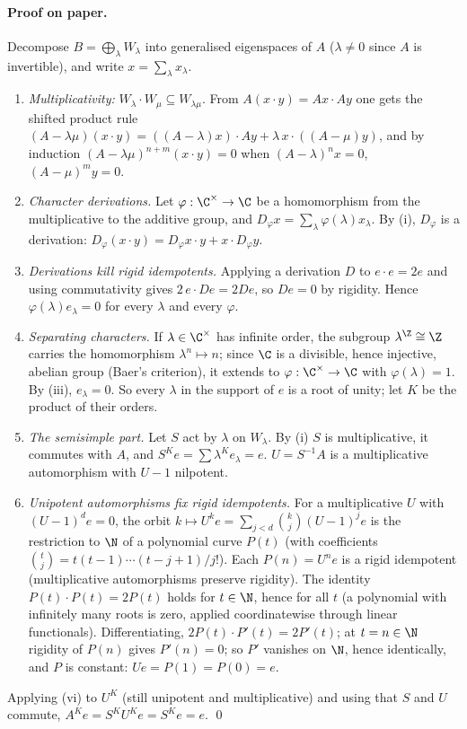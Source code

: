\paragraph{Proof on paper.}  Decompose $B=\bigoplus_\lambda W_\lambda$ into generalised eigenspaces of $A$ ($\lambda\neq0$
since $A$ is invertible), and write $x=\sum_\lambda x_\lambda$.
\begin{enumerate}[label=(\roman*)]
\item \emph{Multiplicativity:} $W_\lambda\cdot W_\mu\subseteq W_{\lambda\mu}$.  From $A(x\cdot y)=Ax\cdot Ay$ one gets the
  shifted product rule $(A-\lambda\mu)(x\cdot y)=((A-\lambda)x)\cdot Ay+\lambda\,x\cdot((A-\mu)y)$, and by induction
  $(A-\lambda\mu)^{n+m}(x\cdot y)=0$ when $(A-\lambda)^nx=0$, $(A-\mu)^my=0$.
\item \emph{Character derivations.}  Let $\varphi:\C^\times\to\C$ be a homomorphism from the multiplicative to the
  additive group, and $D_\varphi x=\sum_\lambda\varphi(\lambda)x_\lambda$.  By (i), $D_\varphi$ is a derivation:
  $D_\varphi(x\cdot y)=D_\varphi x\cdot y+x\cdot D_\varphi y$.
\item \emph{Derivations kill rigid idempotents.}  Applying a derivation $D$ to $e\cdot e=2e$ and using commutativity gives
  $2\,e\cdot De=2De$, so $De=0$ by rigidity.  Hence $\varphi(\lambda)e_\lambda=0$ for every $\lambda$ and every $\varphi$.
\item \emph{Separating characters.}  If $\lambda\in\C^\times$ has infinite order, the subgroup $\lambda^\Z\cong\Z$ carries the
  homomorphism $\lambda^n\mapsto n$; since $\C$ is a divisible, hence injective, abelian group (Baer's criterion), it
  extends to $\varphi:\C^\times\to\C$ with $\varphi(\lambda)=1$.  By (iii), $e_\lambda=0$.  So every $\lambda$ in the support
  of $e$ is a root of unity; let $K$ be the product of their orders.
\item \emph{The semisimple part.}  Let $S$ act by $\lambda$ on $W_\lambda$.  By (i) $S$ is multiplicative, it commutes with
  $A$, and $S^Ke=\sum\lambda^Ke_\lambda=e$.  $U=S^{-1}A$ is a multiplicative automorphism with $U-1$ nilpotent.
\item \emph{Unipotent automorphisms fix rigid idempotents.}  For a multiplicative $U$ with $(U-1)^de=0$, the orbit
  $k\mapsto U^ke=\sum_{j<d}\binom kj(U-1)^je$ is the restriction to $\N$ of a polynomial curve $P(t)$ (with coefficients
  $\binom tj=t(t-1)\cdots(t-j+1)/j!$).  Each $P(n)=U^ne$ is a rigid idempotent (multiplicative automorphisms preserve
  rigidity).  The identity $P(t)\cdot P(t)=2P(t)$ holds for $t\in\N$, hence for all $t$ (a polynomial with infinitely many
  roots is zero, applied coordinatewise through linear functionals).  Differentiating, $2P(t)\cdot P'(t)=2P'(t)$; at
  $t=n\in\N$ rigidity of $P(n)$ gives $P'(n)=0$; so $P'$ vanishes on $\N$, hence identically, and $P$ is constant:
  $Ue=P(1)=P(0)=e$.
\end{enumerate}
Applying (vi) to $U^K$ (still unipotent and multiplicative) and using that $S$ and $U$ commute,
$A^Ke=S^KU^Ke=S^Ke=e$. \qed


